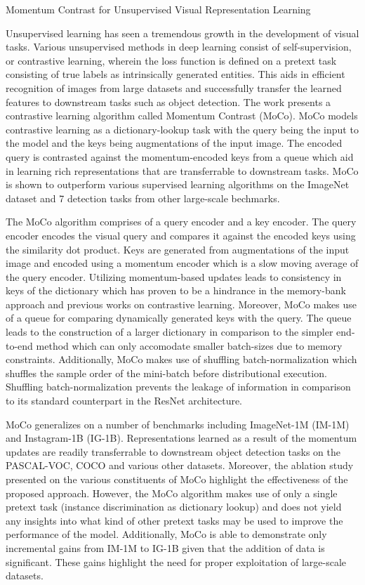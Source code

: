 \documentclass[10pt,letterpaper]{article}
\begin{document}
\begin{center}
  \large{Momentum Contrast for Unsupervised Visual Representation Learning}
\end{center}

Unsupervised learning has seen a tremendous growth in the development of visual tasks. Various unsupervised methods in deep learning consist of self-supervision, or contrastive learning, wherein the loss function is defined on a pretext task consisting of true labels as intrinsically generated entities. This aids in efficient recognition of images from large datasets and successfully transfer the learned features to downstream tasks such as object detection. The work presents a contrastive learning algorithm called Momentum Contrast (MoCo). MoCo models contrastive learning as a dictionary-lookup task with the query being the input to the model and the keys being augmentations of the input image. The encoded query is contrasted against the momentum-encoded keys from a queue which aid in learning rich representations that are transferrable to downstream tasks. MoCo is shown to outperform various supervised learning algorithms on the ImageNet dataset and 7 detection tasks from other large-scale bechmarks.

The MoCo algorithm comprises of a query encoder and a key encoder. The query encoder encodes the visual query and compares it against the encoded keys using the similarity dot product. Keys are generated from augmentations of the input image and encoded using a momentum encoder which is a slow moving average of the query encoder. Utilizing momentum-based updates leads to consistency in keys of the dictionary which has proven to be a hindrance in the memory-bank approach and previous works on contrastive learning. Moreover, MoCo makes use of a queue for comparing dynamically generated keys with the query. The queue leads to the construction of a larger dictionary in comparison to the simpler end-to-end method which can only accomodate smaller batch-sizes due to memory constraints. Additionally, MoCo makes use of shuffling batch-normalization which shuffles the sample order of the mini-batch before distributional execution. Shuffling batch-normalization prevents the leakage of information in comparison to its standard counterpart in the ResNet architecture.  

MoCo generalizes on a number of benchmarks including ImageNet-1M (IM-1M) and Instagram-1B (IG-1B). Representations learned as a result of the momentum updates are readily transferrable to downstream object detection tasks on the PASCAL-VOC, COCO and various other datasets. Moreover, the ablation study presented on the various constituents of MoCo highlight the effectiveness of the proposed approach. However, the MoCo algorithm makes use of only a single pretext task (instance discrimination as dictionary lookup) and does not yield any insights into what kind of other pretext tasks may be used to improve the performance of the model. Additionally, MoCo is able to demonstrate only incremental gains from IM-1M to IG-1B given that the addition of data is significant. These gains highlight the need for proper exploitation of large-scale datasets.
\end{document}
